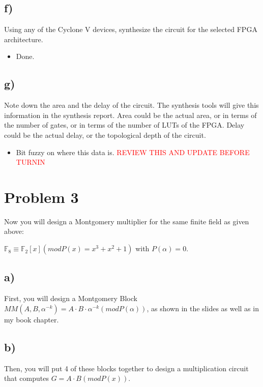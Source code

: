 \documentclass[a4paper,11pt]{exam}
\begin{document}
\subsection{f)}
\label{sec:org0378165}
Using any of the Cyclone V devices, synthesize the circuit for the selected FPGA architecture.
\begin{itemize}
\item Done.
\end{itemize}

\subsection{g)}
\label{sec:org0bd3f09}
Note down the area and the delay of the circuit. The synthesis tools will give this information in the synthesis report. Area could be the actual area, or in terms of the number of gates, or in terms of the number of LUTs of the FPGA. Delay could be the actual delay, or the topological depth of the circuit.
\begin{itemize}
\item Bit fuzzy on where this data is. \textcolor{red}{REVIEW THIS AND UPDATE BEFORE TURNIN}
\end{itemize}

\section{Problem 3}
\label{sec:orgcd64d44}
Now you will design a Montgomery multiplier for the same finite field as given above: \\

\begin{center}
$\mathbb{F}_8 \equiv \mathbb{F}_2 [x] (mod P(x) = x^3 + x^2 + 1)$ with $P(\alpha) = 0$.
\end{center}
\subsection{a)}
\label{sec:org84d9b9e}
First, you will design a Montgomery Block \(MM(A, B, \alpha^{-k} ) = A \cdot B \cdot \alpha^{-k} (mod P(\alpha))\), as shown in the slides as well as in my book chapter.

\subsection{b)}
\label{sec:orgd8ad536}
Then, you will put 4 of these blocks together to design a multiplication circuit that computes \(G = A \cdot B (mod P(x))\).
\end{document}
